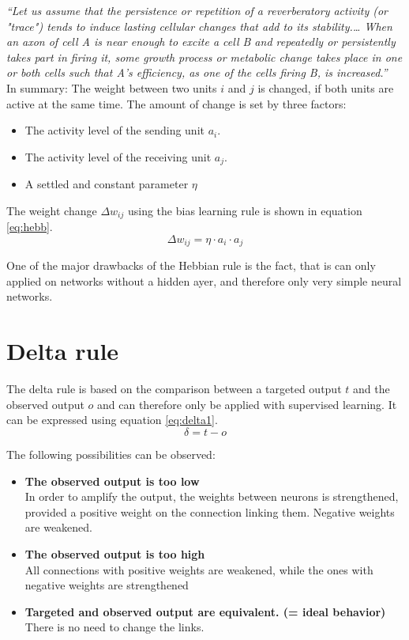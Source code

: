 \documentclass[10pt,a4paper,DIV=11]{scrreprt}
\begin{document}
\textit{“Let us assume that the persistence or repetition of a reverberatory activity (or "trace") tends to induce lasting cellular changes that add to its stability.… When an axon of cell A is near enough to excite a cell B and repeatedly or persistently takes part in firing it, some growth process or metabolic change takes place in one or both cells such that A's efficiency, as one of the cells firing B, is increased.”}\\

In summary: The weight between two units $i$ and $j$ is changed, if both units are active at the same time. The amount of change is set by three factors:

\begin{itemize}
\item The activity level of the sending unit $a_i$.
\item The activity level of the receiving unit $a_j$.
\item A settled and constant parameter $\eta$
\end{itemize}

The weight change $\Delta w_{ij}$ using the bias learning rule is shown in equation \eqref{eq:hebb}.
\begin{equation}
\Delta w_{ij} = \eta \cdot a_i \cdot a_j
\label{eq:hebb}
\end{equation}

One of the major drawbacks of the Hebbian rule is the fact, that is can only applied on networks without a hidden ayer, and therefore only very simple neural networks.

\section{Delta rule}
The delta rule is based on the comparison between a targeted output $t$ and the observed output $o$ and can therefore only be applied with supervised learning.
It can be expressed using equation \eqref{eq:delta1}.
\begin{equation}
\delta = t - o
\label{eq:delta1}
\end{equation}

The following possibilities can be observed:
\begin{itemize}
\item \textbf{The observed output is too low}\\
In order to amplify the output, the weights between neurons is strengthened, provided a positive weight on the connection linking them. Negative weights are weakened.
\item \textbf{The observed output is too high}\\
All connections with positive weights are weakened, while the ones with negative weights are strengthened 
\item \textbf{Targeted and observed output are equivalent. (= ideal behavior)}\\ There is no need to change the links.
\end{itemize}
\end{document}
